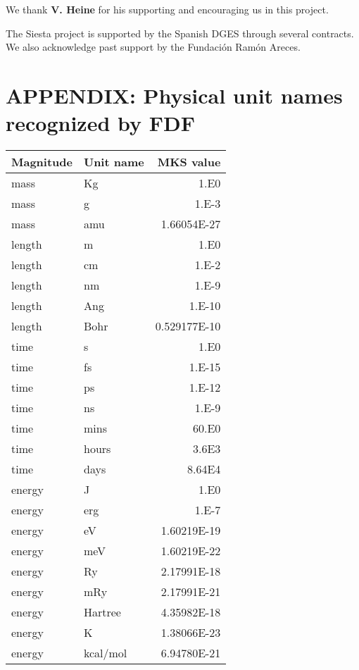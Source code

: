 \documentclass[11pt]{article}
\begin{document}
We thank {\bf V. Heine} for his supporting and encouraging us in this
project.

The {\sc Siesta} project is supported by the Spanish DGES through
several contracts. We also acknowledge past support by the Fundaci\'on
Ram\'on Areces.



\section{APPENDIX: Physical unit names recognized by FDF}

\begin{center}
\begin{tabular}{llr}
Magnitude & Unit name & MKS value \\
\hline
mass     & Kg         & 1.E0 \\
mass     & g          & 1.E-3 \\
mass     & amu        & 1.66054E-27 \\
length   & m          & 1.E0 \\
length   & cm         & 1.E-2 \\
length   & nm         & 1.E-9 \\
length   & Ang        & 1.E-10 \\
length   & Bohr       & 0.529177E-10 \\
time     & s          & 1.E0 \\
time     & fs         & 1.E-15 \\
time     & ps         & 1.E-12 \\
time     & ns         & 1.E-9 \\
time     & mins       & 60.E0 \\
time     & hours      & 3.6E3 \\
time     & days       & 8.64E4 \\
energy   & J          & 1.E0 \\
energy   & erg        & 1.E-7 \\
energy   & eV         & 1.60219E-19 \\
energy   & meV        & 1.60219E-22 \\
energy   & Ry         & 2.17991E-18 \\
energy   & mRy        & 2.17991E-21 \\
energy   & Hartree    & 4.35982E-18 \\
energy   & K          & 1.38066E-23 \\
energy   & kcal/mol   & 6.94780E-21 \\

\end{tabular}
\end{center}
\end{document}
